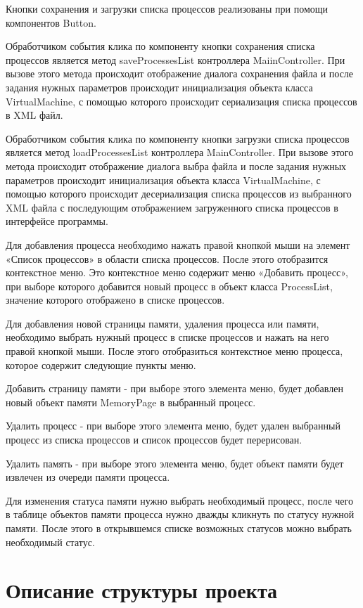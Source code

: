 \documentclass[russian,utf8,simple,hpadding=10mm,vpadding=20mm]{eskdtext}
\begin{document}
Кнопки сохранения и загрузки списка процессов реализованы при помощи компонентов Button.

Обработчиком события клика по компоненту кнопки сохранения списка процессов является метод saveProcessesList контроллера MaiinController. При вызове этого метода происходит отображение диалога сохранения файла и после задания нужных параметров происходит инициализация объекта класса VirtualMachine, с помощью которого происходит сериализация списка процессов в XML файл.

Обработчиком события клика по компоненту кнопки загрузки списка процессов является метод loadProcessesList контроллера MainController. При вызове этого метода происходит отображение диалога выбра файла и после задания нужных параметров происходит инициализация объекта класса VirtualMachine, с помощью которого происходит десериализация списка процессов из выбранного XML файла с последующим отображением загруженного списка процессов в интерфейсе программы.
 
Для добавления процесса необходимо нажать правой кнопкой мыши на элемент «Список процессов» в области списка процессов. После этого отобразится контекстное меню. Это контекстное меню содержит меню «Добавить процесс», при выборе которого добавится новый процесс в объект класса ProcessList, значение которого отображено в списке процессов. 

Для добавления новой страницы памяти, удаления процесса или памяти, необходимо выбрать нужный процесс в списке процессов и нажать на него правой кнопкой мыши. После этого отобразиться контекстное меню процесса, которое содержит следующие пункты меню.

Добавить страницу памяти - при выборе этого элемента меню, будет добавлен новый объект памяти MemoryPage в выбранный процесс.

Удалить процесс - при выборе этого элемента меню, будет удален выбранный процесс из списка процессов и список процессов будет перерисован.

Удалить память - при выборе этого элемента меню, будет объект памяти будет извлечен из очереди памяти процесса.

Для изменения статуса памяти нужно выбрать необходимый процесс, после чего в таблице объектов памяти процесса нужно дважды кликнуть по статусу нужной памяти. После этого в открывшемся списке возможных статусов можно выбрать необходимый статус.

\newpage
\parindent=15mm
\section{Описание структуры проекта}
\end{document}
